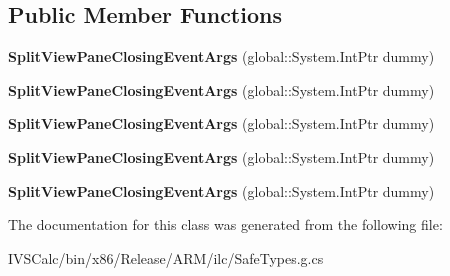 \subsection*{Public Member Functions}
\begin{DoxyCompactItemize}
\item 
\mbox{\label{class_windows_1_1_u_i_1_1_xaml_1_1_controls_1_1_split_view_pane_closing_event_args_ae1c0ee7ca9f0b4053fd6552acf2db984}} 
{\bfseries Split\+View\+Pane\+Closing\+Event\+Args} (global\+::\+System.\+Int\+Ptr dummy)
\item 
\mbox{\label{class_windows_1_1_u_i_1_1_xaml_1_1_controls_1_1_split_view_pane_closing_event_args_ae1c0ee7ca9f0b4053fd6552acf2db984}} 
{\bfseries Split\+View\+Pane\+Closing\+Event\+Args} (global\+::\+System.\+Int\+Ptr dummy)
\item 
\mbox{\label{class_windows_1_1_u_i_1_1_xaml_1_1_controls_1_1_split_view_pane_closing_event_args_ae1c0ee7ca9f0b4053fd6552acf2db984}} 
{\bfseries Split\+View\+Pane\+Closing\+Event\+Args} (global\+::\+System.\+Int\+Ptr dummy)
\item 
\mbox{\label{class_windows_1_1_u_i_1_1_xaml_1_1_controls_1_1_split_view_pane_closing_event_args_ae1c0ee7ca9f0b4053fd6552acf2db984}} 
{\bfseries Split\+View\+Pane\+Closing\+Event\+Args} (global\+::\+System.\+Int\+Ptr dummy)
\item 
\mbox{\label{class_windows_1_1_u_i_1_1_xaml_1_1_controls_1_1_split_view_pane_closing_event_args_ae1c0ee7ca9f0b4053fd6552acf2db984}} 
{\bfseries Split\+View\+Pane\+Closing\+Event\+Args} (global\+::\+System.\+Int\+Ptr dummy)
\end{DoxyCompactItemize}


The documentation for this class was generated from the following file\+:\begin{DoxyCompactItemize}
\item 
I\+V\+S\+Calc/bin/x86/\+Release/\+A\+R\+M/ilc/Safe\+Types.\+g.\+cs\end{DoxyCompactItemize}
